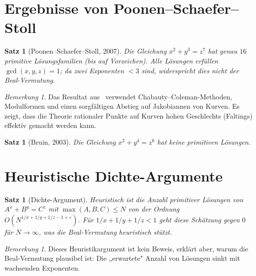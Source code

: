 \documentclass[12pt,a4paper]{amsart}
\newtheorem{satz}[theorem]{Satz}
\theoremstyle{definition}
\theoremstyle{remark}
\newtheorem{bemerkung}[theorem]{Bemerkung}
\begin{document}
\section{Ergebnisse von Poonen--Schaefer--Stoll}

\begin{satz}[Poonen--Schaefer--Stoll, 2007]\label{satz:PSS}
Die Gleichung $x^2 + y^3 = z^7$ hat genau $16$ primitive Lösungsfamilien (bis auf Vorzeichen).
Alle Lösungen erfüllen $\gcd(x,y,z) = 1$; da zwei Exponenten $< 3$ sind, widerspricht dies nicht der Beal-Vermutung.
\end{satz}

\begin{bemerkung}
Das Resultat aus~\cite{PSS07} verwendet Chabauty--Coleman-Methoden, Modulformen
und einen sorgfältigen Abstieg auf Jakobiannen von Kurven. Es zeigt, dass die
Theorie rationaler Punkte auf Kurven hohen Geschlechts (Faltings) effektiv
gemacht werden kann.
\end{bemerkung}

\begin{satz}[Bruin, 2003]\label{satz:bruin}
Die Gleichung $x^2 + y^4 = z^6$ hat keine primitiven Lösungen.
\end{satz}

\section{Heuristische Dichte-Argumente}

\begin{satz}[Dichte-Argument]\label{satz:dichte}
Heuristisch ist die Anzahl primitiver Lösungen von $A^x + B^y = C^z$ mit
$\max(A,B,C) \leq N$ von der Ordnung $O(N^{1/x + 1/y + 1/z - 1 + \varepsilon})$.
Für $1/x + 1/y + 1/z < 1$ geht diese Schätzung gegen $0$ für $N \to \infty$,
was die Beal-Vermutung heuristisch stützt.
\end{satz}

\begin{bemerkung}
Dieses Heuristikargument ist kein Beweis, erklärt aber, warum die Beal-Vermutung
plausibel ist: Die „erwartete" Anzahl von Lösungen sinkt mit wachsenden Exponenten.
\end{bemerkung}
\end{document}
